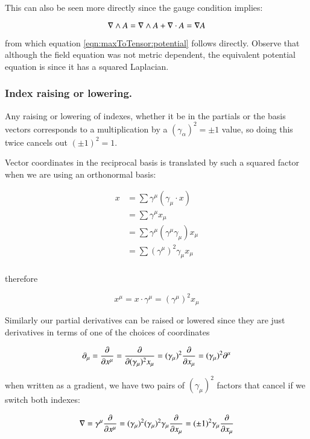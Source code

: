 This can also be seen more directly since the gauge condition implies:

\begin{equation*}
\nabla \wedge A = \nabla \wedge A + \nabla \cdot A = \nabla A
\end{equation*}

from which equation \ref{eqn:maxToTensor:potential} follows directly.  Observe that although the field equation was not metric
dependent, the equivalent potential equation is since it has a squared Laplacian.

\subsubsection{Index raising or lowering. }
Any raising or lowering of indexes, whether it be in the partials or the basis vectors corresponds to a multiplication by a $(\gamma_{\alpha})^2 = \pm 1$ value, so doing this twice cancels out $(\pm 1)^2 = 1$.

Vector coordinates in the reciprocal basis is translated by such a squared
factor when we are using an orthonormal basis:

\begin{align*}
x
&= \sum \gamma^{\mu} ( \gamma_{\mu} \cdot x ) \\
&= \sum \gamma^{\mu} x_{\mu} \\
&= \sum \gamma^{\mu} (\gamma^{\mu} \gamma_{\mu}) x_{\mu} \\
&= \sum (\gamma^{\mu})^2 \gamma_{\mu} x_{\mu} \\
\end{align*}

therefore

\begin{equation*}
x^{\mu} = x \cdot \gamma^{\mu} = (\gamma^{\mu})^2 x_{\mu}
\end{equation*}

Similarly our partial derivatives can be raised or lowered since they are just derivatives in terms of one of the choices of coordinates

\begin{equation*}
\partial_{\mu} = \frac{\partial {}}{\partial {x^{\mu}}} = \frac{\partial {}}{\partial {(\gamma_{\mu})^2 x_{\mu}}} = (\gamma_{\mu})^2 \frac{\partial {}}{\partial {x_{\mu}}} = (\gamma_{\mu})^2 \partial^{\mu}
\end{equation*}

when written as a gradient, we have two pairs of $(\gamma_{\mu})^2$ factors that cancel if we switch both indexes:

\begin{equation*}
\nabla = \gamma^{\mu} \frac{\partial {}}{\partial {x^{\mu}}} = (\gamma_{\mu})^2 (\gamma_{\mu})^2 \gamma_{\mu} \frac{\partial {}}{\partial {x_{\mu}}} = (\pm 1)^2 \gamma_{\mu} \frac{\partial {}}{\partial {x_{\mu}}}
\end{equation*}

